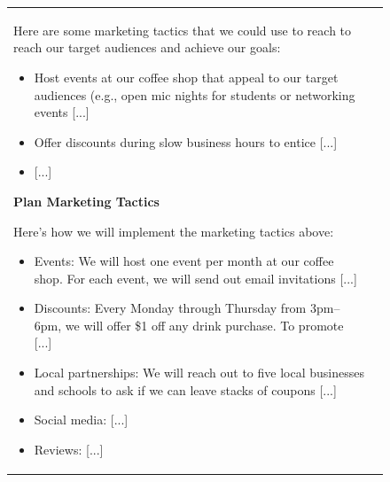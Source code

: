 \begin{figure}[p]
\begin{tabular}{@{}p{}p{}@{}}
    Here are some marketing tactics that we could use to reach to reach our target audiences and achieve our goals:
    \begin{itemize}[leftmargin=8pt]
        \item Host events at our coffee shop that appeal to our target audiences (e.g., open mic nights for students or networking events \textcolor[HTML]{808080}{[...]}
        \item Offer discounts during slow business hours to entice \textcolor[HTML]{808080}{[...]}
        \item \textcolor[HTML]{808080}{[...]}
    \end{itemize}
    
    \textbf{Plan Marketing Tactics}
    
    Here's how we will implement the marketing tactics above:

    \begin{itemize}[leftmargin=8pt]
    \item Events: We will host one event per month at our coffee shop. For each event, we will send out email invitations \textcolor[HTML]{808080}{[...]}
    \item Discounts: Every Monday through Thursday from 3pm–6pm, we will offer \$1 off any drink purchase. To promote \textcolor[HTML]{808080}{[...]}
    \item Local partnerships: We will reach out to five local businesses and schools to ask if we can leave stacks of coupons \textcolor[HTML]{808080}{[...]}
    \item Social media: \textcolor[HTML]{808080}{[...]}
    \item Reviews: \textcolor[HTML]{808080}{[...]}
    \end{itemize}
    

\end{tabular}
\end{figure}
